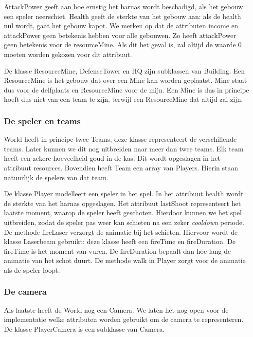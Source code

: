 \documentclass[a4paper,11pt]{article}
\begin{document}
AttackPower geeft aan hoe ernstig het harnas wordt beschadigd, als het gebouw een speler neerschiet. Health geeft de sterkte van het gebouw aan: als de health nul wordt, gaat het gebouw kapot. We merken op dat de attributen income en attackPower geen betekenis hebben voor alle gebouwen. Zo heeft attackPower geen betekenis voor de resourceMine. Als dit het geval is, zal altijd de waarde 0 moeten worden gekozen voor dit attribuut.

De klasse ResourceMine, DefenseTower en HQ zijn subklassen van Building. Een ResourceMine is het gebouw dat over een Mine kan worden geplaatst. Mine staat dus voor de delfplaats en ResourceMine voor de mijn. Een Mine is dus in principe hoeft dus niet van een team te zijn, terwijl een ResourceMine dat altijd zal zijn.

\subsubsection{De speler en teams}
World heeft in principe twee Teams, deze klasse representeert de verschillende teams. Later kunnen we dit nog uitbreiden naar meer dan twee teams. Elk team heeft een zekere hoeveelheid goud in de kas. Dit wordt opgeslagen in het attribuut resources. Bovendien heeft Team een array van Players. Hierin staan natuurlijk de spelers van dat team.

De klasse Player modelleert een speler in het spel. In het attribuut health wordt de sterkte van het harnas opgeslagen. Het attribuut lastShoot representeert het laatste moment, waarop de speler heeft geschoten. Hierdoor kunnen we het spel uitbreiden, zodat de speler pas weer kan schieten na een zeker \emph{cooldown} periode. De methode fireLaser verzorgt de animatie bij het schieten. Hiervoor wordt de klasse Laserbeam gebruikt: deze klasse heeft een fireTime en fireDuration. De fireTime is het moment van vuren. De fireDuration bepaalt dan hoe lang de animatie van het schot duurt. De methode walk in Player zorgt voor de animatie als de speler loopt.

\subsubsection{De camera}
Als laatste heeft de World nog een Camera. We laten het nog open voor de implementatie welke attributen worden gebruikt om de camera te representeren. De klasse PlayerCamera is een subklasse van Camera.
\end{document}
